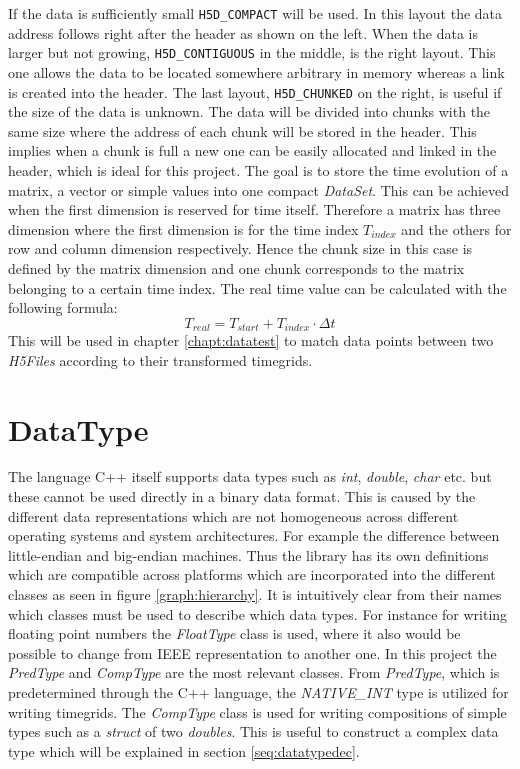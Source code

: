 If the data is sufficiently small \texttt{H5D\_COMPACT} will be used. In this layout the data address follows right after the header as shown on the left. When the data is larger but not growing, \texttt{H5D\_CONTIGUOUS} in the middle, is the right layout. This one allows the data to be located somewhere arbitrary in memory whereas a link is created into the header. The last layout, \texttt{H5D\_CHUNKED} on the right, is useful if the size of the data is unknown. The data will be divided into chunks with the same size where the address of each chunk will be stored in the header. This implies when a chunk is full a new one can be easily allocated and linked in the header, which is ideal for this project.
The goal is to store the time evolution of a matrix, a vector or simple values into one compact \textit{DataSet}. This can be achieved when the first dimension is reserved for time itself. Therefore a matrix has three dimension where the first dimension is for the time index $T_{index}$ and the others for row and column dimension respectively. Hence the chunk size in this case is defined by the matrix dimension and one chunk corresponds to the matrix belonging to a certain time index. The real time value can be calculated with the following formula:
\begin{equation}
\label{eq:mapping}
 T_{real} = T_{start} + T_{index} \cdot \Delta t
\end{equation}
This will be used in chapter \ref{chapt:datatest} to match data points between two \textit{H5Files} according to their transformed timegrids.

\section{DataType}
\label{seq:datatype}
The language C++ itself supports data types such as \emph{int}, \emph{double}, \emph{char} etc. but these cannot be used directly in a binary data format.
This is caused by the different data representations which are not homogeneous across different operating systems and system architectures. For example the difference between little-endian and big-endian machines. Thus the library has its own definitions which are compatible across platforms which are incorporated into the different classes as seen in figure \ref{graph:hierarchy}. It is intuitively clear from their names which classes must be used to describe which data types. For instance for writing floating point numbers the \textit{FloatType} class is used, where it also would be possible to change from IEEE representation to another one. In this project the \textit{PredType} and \textit{CompType} are the most relevant classes. From \textit{PredType}, which is predetermined through the C++ language, the \textit{NATIVE\_INT} type is utilized for writing timegrids. The \textit{CompType} class is used for
writing compositions of simple types such as a \textit{struct} of two \textit{doubles}. This is useful to construct a complex data type which will be explained in section \ref{seq:datatypedec}.

